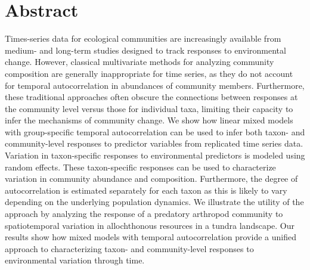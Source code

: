 
\section*{Abstract}

Times-series data for ecological communities are increasingly available from
medium- and long-term studies designed to track responses to environmental change.
However, classical multivariate methods for analyzing community composition are
generally inappropriate for time series, as they do not account for temporal
autocorrelation in abundances of community members.
Furthermore, these traditional approaches often obscure the connections between
responses at the community level versus those for individual taxa, limiting
their capacity to infer the mechanisms of community change.
We show how linear mixed models with group-specific temporal autocorrelation can be
used to infer both taxon- and community-level responses to predictor variables from
replicated time series data.
Variation in taxon-specific responses to environmental predictors is modeled using
random effects.
These taxon-specific responses can be used to characterize variation in community
abundance and composition.
Furthermore, the degree of autocorrelation is estimated separately for each taxon as
this is likely to vary depending on the underlying population dynamics.
We illustrate the utility of the approach by analyzing the response of a predatory
arthropod community to spatiotemporal variation in allochthonous resources in a
tundra landscape.
Our results show how mixed models with temporal autocorrelation provide a unified
approach to characterizing taxon- and community-level responses to environmental
variation through time.
